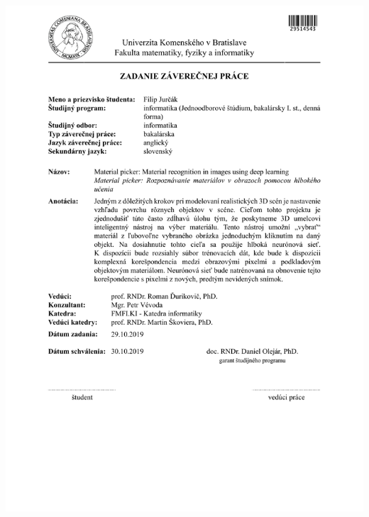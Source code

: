 \documentclass[12pt, twoside]{book}
\begin{document}
\newpage 
\thispagestyle{empty}
\hspace{-2cm}\includegraphics[width=1.1\textwidth]{praca/images/zadanie-jurcak-sk.pdf}
\end{document}
